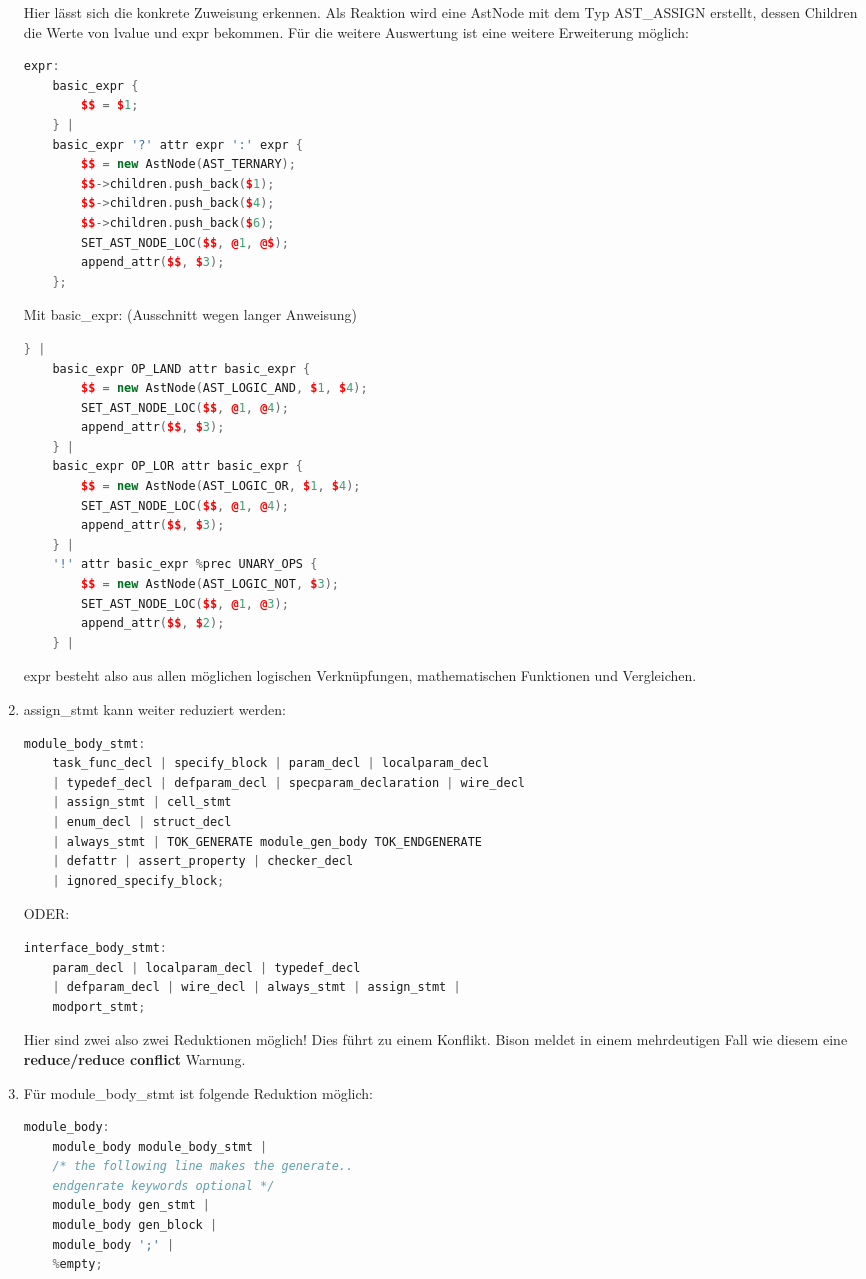 \documentclass[11pt]{report}
\begin{document}
\begin{enumerate}
  Hier lässt sich die konkrete Zuweisung erkennen. 
  Als Reaktion wird eine AstNode mit dem Typ AST\_ASSIGN erstellt, dessen Children die Werte von lvalue und expr bekommen.
  Für die weitere Auswertung ist eine weitere Erweiterung möglich:
  \begin{lstlisting}[language=C++]
  	expr:
	basic_expr {
		$$ = $1;
	} |
	basic_expr '?' attr expr ':' expr {
		$$ = new AstNode(AST_TERNARY);
		$$->children.push_back($1);
		$$->children.push_back($4);
		$$->children.push_back($6);
		SET_AST_NODE_LOC($$, @1, @$);
		append_attr($$, $3);
	};
  \end{lstlisting}
Mit basic\_expr: (Ausschnitt wegen langer Anweisung)
\begin{lstlisting}[language=C++]
	} |
	basic_expr OP_LAND attr basic_expr {
		$$ = new AstNode(AST_LOGIC_AND, $1, $4);
		SET_AST_NODE_LOC($$, @1, @4);
		append_attr($$, $3);
	} |
	basic_expr OP_LOR attr basic_expr {
		$$ = new AstNode(AST_LOGIC_OR, $1, $4);
		SET_AST_NODE_LOC($$, @1, @4);
		append_attr($$, $3);
	} |
	'!' attr basic_expr %prec UNARY_OPS {
		$$ = new AstNode(AST_LOGIC_NOT, $3);
		SET_AST_NODE_LOC($$, @1, @3);
		append_attr($$, $2);
	} |
\end{lstlisting}

expr besteht also aus allen möglichen logischen Verknüpfungen, mathematischen Funktionen und Vergleichen.
\item assign\_stmt kann weiter reduziert werden:
\begin{lstlisting}[language=C++]
	module_body_stmt:
	task_func_decl | specify_block | param_decl | localparam_decl
	| typedef_decl | defparam_decl | specparam_declaration | wire_decl 
	| assign_stmt | cell_stmt 
	| enum_decl | struct_decl 
	| always_stmt | TOK_GENERATE module_gen_body TOK_ENDGENERATE
	| defattr | assert_property | checker_decl
	| ignored_specify_block;
\end{lstlisting}
ODER:
\begin{lstlisting}[language=C++]
	interface_body_stmt:
	param_decl | localparam_decl | typedef_decl 
	| defparam_decl | wire_decl | always_stmt | assign_stmt |
	modport_stmt;
\end{lstlisting}

Hier sind zwei also zwei Reduktionen möglich! Dies führt zu einem Konflikt. Bison meldet in einem mehrdeutigen Fall wie diesem eine \textbf{reduce/reduce conflict} Warnung.
\item Für module\_body\_stmt ist folgende Reduktion möglich:
\begin{lstlisting}[language=C++]
	module_body:
	module_body module_body_stmt |
	/* the following line makes the generate..
	endgenrate keywords optional */
	module_body gen_stmt |
	module_body gen_block |
	module_body ';' |
	%empty;
\end{lstlisting}


\end{enumerate}
\end{document}
